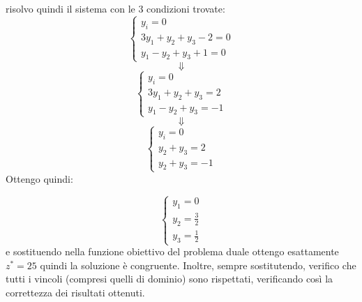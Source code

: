 \documentclass[a4paper,12pt, oneside]{book}
\begin{document}
\newpage
risolvo quindi il sistema con le 3 condizioni trovate:
\[
  \begin{cases}
    y_i=0\\
    3y_1+y_2+y_3-2=0\\
    y_1-y_2+y_3+1=0
  \end{cases}
\]
\[\Downarrow\]
\[
  \begin{cases}
    y_i=0\\
    3y_1+y_2+y_3=2\\
    y_1-y_2+y_3=-1
  \end{cases}
\]
\[\Downarrow\]
\[
  \begin{cases}
    y_i=0\\
    y_2+y_3=2\\
    y_2+y_3=-1
  \end{cases}
\]
Ottengo quindi:
\begin{shaded}
  \[
    \begin{cases}
      y_1=0\\
      y_2=\frac{3}{2}\\
      y_3=\frac{1}{2}
    \end{cases}
  \]
  e sostituendo nella funzione obiettivo del problema duale ottengo
  esattamente $z^*=25$ quindi la soluzione è congruente. Inoltre,
  sempre sostitutendo, verifico che tutti i vincoli (compresi quelli
  di dominio) sono rispettati, verificando così la correttezza dei
  risultati ottenuti.
\end{shaded}
\end{document}
